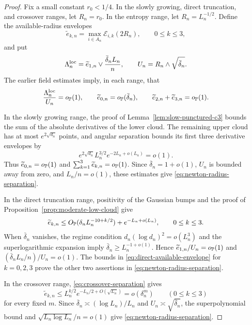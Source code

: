 \begin{proof}
Fix a small constant \(r_0<1/4\).  In the slowly growing, direct
truncation, and crossover ranges, let \(R_n=r_0\).  In the entropy range,
let \(R_n=L_n^{-1/2}\).  Define the available-radius envelopes
\[
 \widetilde e_{k,n}
 =
 \max_{i\in A_n}\mathcal E_{i,k}(2R_n),
 \qquad 0\le k\le3,
\]
and put
\[
 \Lambda_n^{\rm loc}
 =\widetilde e_{1,n}\vee\frac{\bar\delta_nL_n}{n},
 \qquad
 U_n=R_n\wedge\sqrt{\bar\delta_n}.
\]
The earlier field estimates imply, in each range, that
\begin{equation}
\label{eq:newton-radius-separation}
 \frac{\Lambda_n^{\rm loc}}{U_n}=o_{\mathbb P}(1),
 \qquad
 \widetilde e_{0,n}=o_{\mathbb P}(\bar\delta_n),
 \qquad
 \widetilde e_{2,n}+\widetilde e_{3,n}=o_{\mathbb P}(1).
\end{equation}

In the slowly growing range, the proof of
Lemma~\ref{lem:slow-punctured-c3} bounds the sum of the absolute
derivatives of the lower cloud.  The remaining upper cloud has at most
\(e^{2\sqrt{d_n}}\) points, and angular separation bounds its first three
derivative envelopes by
\[
 e^{2\sqrt{d_n}}L_n^{3/2}e^{-2L_n+o(L_n)}=o(1).
\]
Thus \(\widetilde e_{0,n}=o_{\mathbb P}(1)\) and
\(\sum_{k=1}^3\widetilde e_{k,n}=o_{\mathbb P}(1)\).  Since
\(\bar\delta_n=1+o(1)\), \(U_n\) is bounded away from zero, and
\(L_n/n=o(1)\), these estimates give \eqref{eq:newton-radius-separation}.

In the direct truncation range, positivity of the Gaussian bumps and the
proof of Proposition~\ref{prop:moderate-low-cloud} give
\begin{equation}
\label{eq:direct-available-envelope}
 \widetilde e_{k,n}
 \le
 O_{\mathbb P}(\delta_nL_n^{-10+k/2})+e^{-L_n+o(L_n)},
 \qquad 0\le k\le3.
\end{equation}
When \(\bar\delta_n\) vanishes, the regime condition
\(d_n(\log d_n)^2=o(L_n^3)\) and the superlogarithmic expansion imply
\(\bar\delta_n\ge L_n^{-1+o(1)}\).  Hence
\(\widetilde e_{1,n}/U_n=o_{\mathbb P}(1)\) and
\((\bar\delta_nL_n/n)/U_n=o(1)\). The bounds in
\eqref{eq:direct-available-envelope} for \(k=0,2,3\) prove the other two assertions in
\eqref{eq:newton-radius-separation}.

In the crossover range, \eqref{eq:crossover-separation} gives
\begin{equation}
\label{eq:crossover-absolute-envelope}
 \widetilde e_{k,n}
 \le
 L_n^{k/2}e^{-L_n/2+O(\sqrt{L_n})}
 =o(\delta_n^m)
 \qquad(0\le k\le3)
\end{equation}
for every fixed \(m\).  Since
\(\bar\delta_n\asymp(\log L_n)/L_n\) and
\(U_n\asymp\sqrt{\bar\delta_n}\), the superpolynomial bound and
\(\sqrt{L_n\log L_n}/n=o(1)\) give
\eqref{eq:newton-radius-separation}.


\end{proof}
